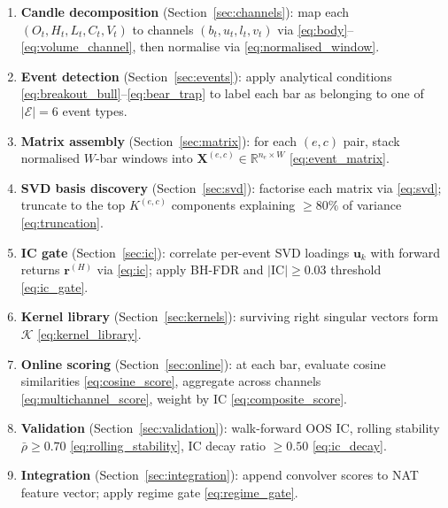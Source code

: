 \documentclass[11pt,a4paper]{article}
\theoremstyle{definition}
\theoremstyle{plain}
\newcommand{\R}{\mathbb{R}}
\newcommand{\Xmat}{\mathbf{X}}
\newcommand{\bvec}[1]{\mathbf{#1}}
\begin{document}
\begin{enumerate}
    \item \textbf{Candle decomposition} (Section~\ref{sec:channels}): map each
          $(O_t, H_t, L_t, C_t, V_t)$ to channels $(b_t, u_t, l_t, v_t)$ via
          \eqref{eq:body}--\eqref{eq:volume_channel}, then normalise via
          \eqref{eq:normalised_window}.

    \item \textbf{Event detection} (Section~\ref{sec:events}): apply analytical
          conditions \eqref{eq:breakout_bull}--\eqref{eq:bear_trap} to label each bar as
          belonging to one of $|\mathcal{E}| = 6$ event types.

    \item \textbf{Matrix assembly} (Section~\ref{sec:matrix}): for each $(e, c)$ pair,
          stack normalised $W$-bar windows into $\Xmat^{(e,c)} \in \R^{n_e \times W}$
          \eqref{eq:event_matrix}.

    \item \textbf{SVD basis discovery} (Section~\ref{sec:svd}): factorise each matrix
          via \eqref{eq:svd}; truncate to the top $K^{(e,c)}$ components explaining
          $\geq 80\%$ of variance \eqref{eq:truncation}.

    \item \textbf{IC gate} (Section~\ref{sec:ic}): correlate per-event SVD loadings
          $\bvec{u}_k$ with forward returns $\bvec{r}^{(H)}$ via \eqref{eq:ic}; apply
          BH-FDR and $|\mathrm{IC}| \geq 0.03$ threshold \eqref{eq:ic_gate}.

    \item \textbf{Kernel library} (Section~\ref{sec:kernels}): surviving right singular
          vectors form $\mathcal{K}$ \eqref{eq:kernel_library}.

    \item \textbf{Online scoring} (Section~\ref{sec:online}): at each bar, evaluate
          cosine similarities \eqref{eq:cosine_score}, aggregate across channels
          \eqref{eq:multichannel_score}, weight by IC \eqref{eq:composite_score}.

    \item \textbf{Validation} (Section~\ref{sec:validation}): walk-forward OOS IC,
          rolling stability $\bar{\rho} \geq 0.70$ \eqref{eq:rolling_stability}, IC
          decay ratio $\geq 0.50$ \eqref{eq:ic_decay}.

    \item \textbf{Integration} (Section~\ref{sec:integration}): append convolver scores
          to NAT feature vector; apply regime gate \eqref{eq:regime_gate}.
\end{enumerate}
\end{document}
